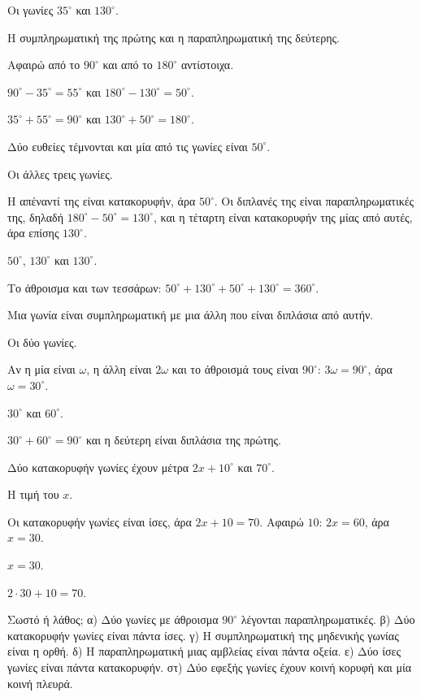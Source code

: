 \tixero Οι γωνίες $35^\circ$ και $130^\circ$.\par
\tithelo Η συμπληρωματική της πρώτης και η παραπληρωματική της δεύτερης.\par
\possindeo Αφαιρώ από το $90^\circ$ και από το $180^\circ$ αντίστοιχα.\par
\apantisi $90^\circ-35^\circ=55^\circ$ και $180^\circ-130^\circ=50^\circ$.\par
\elegxos $35^\circ+55^\circ=90^\circ$ και $130^\circ+50^\circ=180^\circ$.

\tixero Δύο ευθείες τέμνονται και μία από τις γωνίες είναι $50^\circ$.\par
\tithelo Οι άλλες τρεις γωνίες.\par
\possindeo Η απέναντί της είναι κατακορυφήν, άρα $50^\circ$. Οι διπλανές της είναι παραπληρωματικές της, δηλαδή $180^\circ-50^\circ=130^\circ$, και η τέταρτη είναι κατακορυφήν της μίας από αυτές, άρα επίσης $130^\circ$.\par
\apantisi $50^\circ$, $130^\circ$ και $130^\circ$.\par
\elegxos Το άθροισμα και των τεσσάρων: $50^\circ+130^\circ+50^\circ+130^\circ=360^\circ$.

\tixero Μια γωνία είναι συμπληρωματική με μια άλλη που είναι διπλάσια από αυτήν.\par
\tithelo Οι δύο γωνίες.\par
\possindeo Αν η μία είναι $\omega$, η άλλη είναι $2\omega$ και το άθροισμά τους είναι $90^\circ$: $3\omega=90^\circ$, άρα $\omega=30^\circ$.\par
\apantisi $30^\circ$ και $60^\circ$.\par
\elegxos $30^\circ+60^\circ=90^\circ$ και η δεύτερη είναι διπλάσια της πρώτης.

\tixero Δύο κατακορυφήν γωνίες έχουν μέτρα $2x+10^\circ$ και $70^\circ$.\par
\tithelo Η τιμή του $x$.\par
\possindeo Οι κατακορυφήν γωνίες είναι ίσες, άρα $2x+10=70$. Αφαιρώ $10$: $2x=60$, άρα $x=30$.\par
\apantisi $x=30$.\par
\elegxos $2\cdot30+10=70$.



\ex Σωστό ή λάθος; α) Δύο γωνίες με άθροισμα $90^\circ$ λέγονται παραπληρωματικές. \quad β) Δύο κατακορυφήν γωνίες είναι πάντα ίσες. \quad γ) Η συμπληρωματική της μηδενικής γωνίας είναι η ορθή. \quad δ) Η παραπληρωματική μιας αμβλείας είναι πάντα οξεία. \quad ε) Δύο ίσες γωνίες είναι πάντα κατακορυφήν. \quad στ) Δύο εφεξής γωνίες έχουν κοινή κορυφή και μία κοινή πλευρά.

